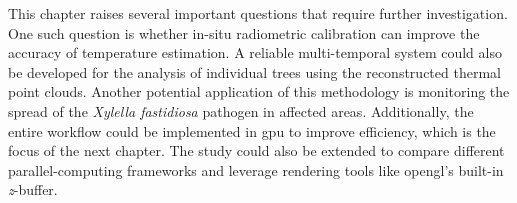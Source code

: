 This chapter raises several important questions that require further investigation. One such question is whether in-situ radiometric calibration can improve the accuracy of temperature estimation. A reliable multi-temporal system could also be developed for the analysis of individual trees using the reconstructed thermal point clouds. Another potential application of this methodology is monitoring the spread of the \textit{Xylella fastidiosa} pathogen in affected areas. Additionally, the entire workflow could be implemented in \acrshort{gpu} to improve efficiency, which is the focus of the next chapter. The study could also be extended to compare different parallel-computing frameworks and leverage rendering tools like \acrshort{opengl}'s built-in \textit{z}-buffer.